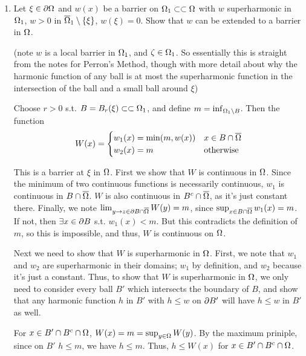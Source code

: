 \begin{enumerate}
\item
  Let $\xi \in \partial \Omega$ and $w(x)$ be a barrier on $\Omega_1 \subset \subset \Omega$ with $w$ superharmonic in $\Omega_1$, $w > 0$
  in $\overline{\Omega}_1 \setminus \{ \xi \}$, $w(\xi) = 0$.
  Show that $w$ can be extended to a barrier in $\Omega$.

  (note $w$ is a local barrier in $\Omega_1$, and $\zeta \in \Omega_1$.
  So essentially this is straight from the notes for Perron's Method, though with more detail about why the harmonic function of any ball
  is at most the superharmonic function in the intersection of the ball and a small ball around $\xi$)

  Choose $r > 0$ s.t. $B = B_r(\xi) \subset \subset \Omega_1$, and define $m = \inf_{\Omega_1 \setminus B}$.
  Then the function
  $$
  W(x) =
  \begin{cases}
    w_1(x) = \min(m, w(x)) & x \in B \cap \overline{\Omega}\\
    w_2(x) = m & \text{otherwise}
  \end{cases}
  $$

  This is a barrier at $\xi$ in $\Omega$.
  First we show that $W$ is continuous in $\Omega$.
  Since the minimum of two continuous functions is necessarily continuous, $w_1$ is continuous in $B \cap \overline{\Omega}$.
  $W$ is also continuous in $B^c \cap \overline{\Omega}$, as it's just constant there.
  Finally, we note $\lim_{y \rightarrow z \in \partial B \cap \overline{\Omega}} W(y) = m$, since $\sup_{x \in B \cap \overline{\Omega}} w_1(x) = m$.
  If not, then $\exists x \in \partial B$ s.t. $w_1(x) < m$.
  But this contradicts the definition of $m$, so this is impossible, and thus, $W$ is continuous on $\Omega$.

  Next we need to show that $W$ is superharmonic in $\Omega$.
  First, we note that $w_1$ and $w_2$ are superharmonic in their domains; $w_1$ by definition, and $w_2$ because it's just a constant.
  Thus, to show that $W$ is superharmonic in $\Omega$, we only need to consider every ball $B'$ which intersects the boundary of $B$,
  and show that any harmonic function $h$ in $B'$ with $h \leq w$ on $\partial B'$ will have $h \leq w$ in $B'$ as well.

  For $x \in B' \cap B^c \cap \Omega$, $W(x) = m = \sup_{y \in \Omega} W(y)$.
  By the maximum priniple, since on $B'$ $h \leq m$, we have $h \leq m$.
  Thus, $h \leq W(x)$ for $x \in B' \cap B^c \cap \Omega$.


\end{enumerate}
